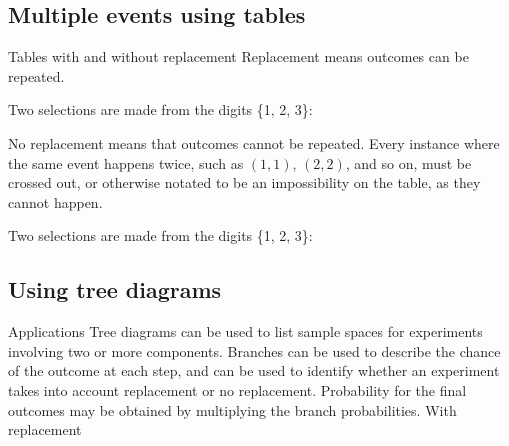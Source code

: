 \begin{outline}
\0
\subsection{Multiple events using tables}
	\1 Tables with and without replacement
		\2 Replacement means outcomes can be repeated.
		
\begin{center}
Two selections are made from the digits \{1, 2, 3\}:
\end{center}

		\2 No replacement means that outcomes cannot be repeated. Every instance where the same event happens twice, such as $(1,1)$, $(2,2)$, and so on, must be crossed out, or otherwise notated to be an impossibility on the table, as they cannot happen.
		
\begin{center}
Two selections are made from the digits \{1, 2, 3\}:
\end{center}

\0
\subsection{Using tree diagrams}
	\1 Applications
		\2 Tree diagrams can be used to list sample spaces for experiments involving two or more components. Branches can be used to describe the chance of the outcome at each step, and can be used to identify whether an experiment takes into account replacement or no replacement. Probability for the final outcomes may be obtained by multiplying the branch probabilities.
			\3 With replacement


\end{outline}
